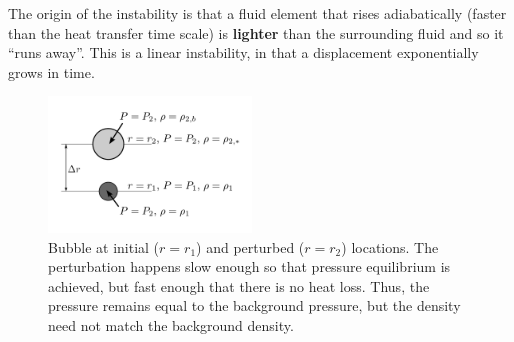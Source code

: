 \documentclass[10pt]{article}
\numberwithin{equation}{section}
\newcommand{\n}{\noindent}
\begin{document}
\n The origin of the instability is that a fluid element that rises
adiabatically (faster than the heat transfer time scale) is
\textbf{lighter} than the surrounding fluid and so it
``runs away''. This is a linear instability, in that a displacement
exponentially grows in time. \\

\begin{figure}
	\centering
	\includegraphics[width=0.48\textwidth]{figures/convection_scheme.pdf}
	\caption{Bubble at initial ($r=r_1$) and perturbed ($r=r_2$) locations. The
perturbation happens slow enough so that pressure equilibrium is achieved, but
fast enough that there is no heat loss. Thus, the pressure remains equal to the
background pressure, but the density need not match the background density.}	
\end{figure}
\end{document}
